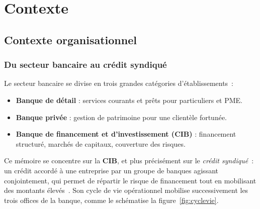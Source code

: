 \section{Contexte}
\label{context}

\subsection{Contexte organisationnel}
\label{subsec:organisation}

\subsubsection{Du secteur bancaire au crédit syndiqué}
\label{subsec:banque-structure}

Le secteur bancaire se divise en trois grandes catégories d'établissements~:
\begin{itemize}
    \item \textbf{Banque de détail} : services courants et prêts pour particuliers et PME.
    \item \textbf{Banque privée} : gestion de patrimoine pour une clientèle fortunée.
    \item \textbf{Banque de financement et d'investissement (CIB)} : financement structuré, marchés de capitaux, couverture des risques.
\end{itemize}

Ce mémoire se concentre sur la \textbf{CIB}, et plus précisément sur le \textit{crédit syndiqué}~: un crédit accordé à une entreprise par un groupe de banques agissant conjointement, qui permet de répartir le risque de financement tout en mobilisant des montants élevés~\cite{lma2024}.
Son cycle de vie opérationnel mobilise successivement les trois offices de la banque, comme le schématise la figure~\ref{fig:cyclevie}.

